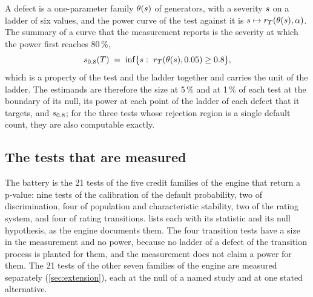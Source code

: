A defect is a one-parameter family $\theta(s)$ of generators, with a severity $s$ on a ladder of six values, and the power curve of the test against it is $s\mapsto r_T(\theta(s),\alpha)$.
The summary of a curve that the measurement reports is the severity at which the power first reaches 80\,\%,
\begin{equation}
\sev_{0.8}(T)\;=\;\inf\{\sev:\ \rej_T(\theta(\sev),0.05)\ge 0.8\},
\label{eq:s80}
\end{equation}
which is a property of the test and the ladder together and carries the unit of the ladder.
The estimands are therefore the size at 5\,\% and at 1\,\% of each test at the boundary of its null, its power at each point of the ladder of each defect that it targets, and $s_{0.8}$; for the three tests whose rejection region is a single default count, they are also computable exactly.

\subsection{The tests that are measured}
\label{sec:pf-tests}

The battery is the 21 tests of the five credit families of the engine that return a p-value: nine tests of the calibration of the default probability, two of discrimination, four of population and characteristic stability, two of the rating system, and four of rating transitions.
 lists each with its statistic and its null hypothesis, as the engine documents them.
The four transition tests have a size in the measurement and no power, because no ladder of a defect of the transition process is planted for them, and the measurement does not claim a power for them. The 21 tests of the other seven families of the engine are measured separately (\cref{sec:extension}), each at the null of a named study and at one stated alternative.

